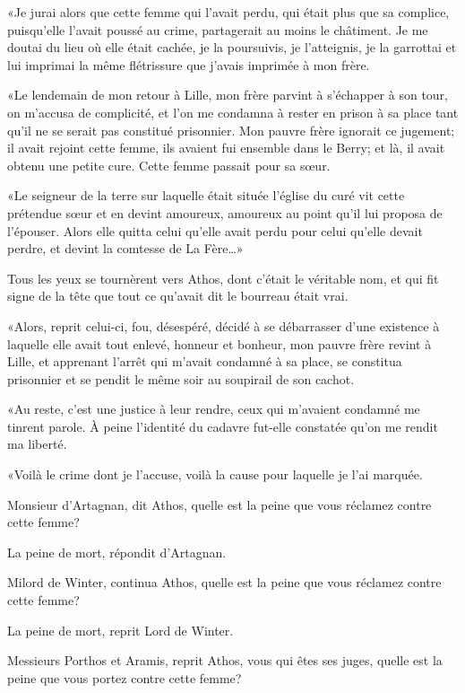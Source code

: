 «Je jurai alors que cette femme qui l'avait perdu, qui était plus que sa complice, puisqu'elle l'avait poussé au crime, partagerait au moins le châtiment. Je me doutai du lieu où elle était cachée, je la poursuivis, je l'atteignis, je la garrottai et lui imprimai la même flétrissure que j'avais imprimée à mon frère. 

«Le lendemain de mon retour à Lille, mon frère parvint à s'échapper à son tour, on m'accusa de complicité, et l'on me condamna à rester en prison à sa place tant qu'il ne se serait pas constitué prisonnier. Mon pauvre frère ignorait ce jugement; il avait rejoint cette femme, ils avaient fui ensemble dans le Berry; et là, il avait obtenu une petite cure. Cette femme passait pour sa sœur. 

«Le seigneur de la terre sur laquelle était située l'église du curé vit cette prétendue sœur et en devint amoureux, amoureux au point qu'il lui proposa de l'épouser. Alors elle quitta celui qu'elle avait perdu pour celui qu'elle devait perdre, et devint la comtesse de La Fère\dots» 

Tous les yeux se tournèrent vers Athos, dont c'était le véritable nom, et qui fit signe de la tête que tout ce qu'avait dit le bourreau était vrai. 

«Alors, reprit celui-ci, fou, désespéré, décidé à se débarrasser d'une existence à laquelle elle avait tout enlevé, honneur et bonheur, mon pauvre frère revint à Lille, et apprenant l'arrêt qui m'avait condamné à sa place, se constitua prisonnier et se pendit le même soir au soupirail de son cachot. 

«Au reste, c'est une justice à leur rendre, ceux qui m'avaient condamné me tinrent parole. À peine l'identité du cadavre fut-elle constatée qu'on me rendit ma liberté. 

«Voilà le crime dont je l'accuse, voilà la cause pour laquelle je l'ai marquée. 

\speak  Monsieur d'Artagnan, dit Athos, quelle est la peine que vous réclamez contre cette femme? 

\speak  La peine de mort, répondit d'Artagnan. 

\speak  Milord de Winter, continua Athos, quelle est la peine que vous réclamez contre cette femme? 

\speak  La peine de mort, reprit Lord de Winter. 

\speak  Messieurs Porthos et Aramis, reprit Athos, vous qui êtes ses juges, quelle est la peine que vous portez contre cette femme? 

